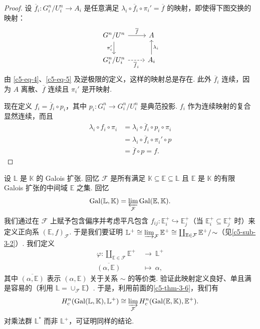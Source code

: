 \begin{proof}
设 $\overline{f}_i:G_i^n/U_i^n\to A_i$ 是任意满足 $\lambda_i\circ\overline{f}_i\circ\pi_i'=\overline{f}$ 的映射，即使得下图交换的映射：
\[
\begin{tikzcd}
G^n/U^n \arrow[r,"\overline{f}"] \arrow[d,"\pi_i'"'] & A \\
G_i^n/U_i^n \arrow[r,dashed,"\overline{f}_i"'] & A_i \arrow[u,"\lambda_i"']
\end{tikzcd}
\]
由 \eqref{c5-eq-4}、\eqref{c5-eq-5} 及逆极限的定义，这样的映射总是存在. 此外 $\overline{f}_i$ 连续，因为 $A$ 离散、$\overline{f}$ 连续且 $\pi_i'$ 是开映射.

现在定义 $f_i=\overline{f}_i\circ p_i$，其中 $p_i:G_i^n\to G_i^n/U_i^n$ 是典范投影. $f_i$ 作为连续映射的复合显然连续，而且
\[
\begin{aligned}
\lambda_i\circ f_i\circ\pi_i&=\lambda_i\circ\overline{f}_i\circ p_i\circ\pi_i\\
&=\lambda_i\circ\overline{f}_i\circ\pi_i'\circ p\\
&=\overline{f}\circ p=f.
\end{aligned}
\]
\end{proof}

\begin{example}\label{c5-ex-3-7}
设 $\mathbb{L}$ 是 $\mathbb{K}$ 的 Galois 扩张. 回忆 $\mathcal{F}$ 是所有满足 $\mathbb{K}\subseteq\mathbb{E}\subseteq\mathbb{L}$ 且 $\mathbb{E}$ 是 $\mathbb{K}$ 的有限 Galois 扩张的中间域 $\mathbb{E}$ 之集. 回忆
\[
\mathrm{Gal}(\mathbb{L},\mathbb{K})=\varprojlim_{\mathcal{F}}\mathrm{Gal}(\mathbb{E},\mathbb{K}).
\]
我们通过在 $\mathcal{F}$ 上赋予包含偏序并考虑平凡包含 $f_{ij}:\mathbb{E}_i^+\hookrightarrow\mathbb{E}_j^+$（当 $\mathbb{E}_i^+\subseteq\mathbb{E}_j^+$ 时）来定义正向系 $(\mathbb{E},f)_{\mathcal{F}}$. 于是我们要证明 $\mathbb{L}^+\cong\varinjlim_{\mathcal{F}}\mathbb{E}^+\cong\coprod_{\mathbb{E}\in\mathcal{F}}\mathbb{E}^+/\!\sim$（见\autoref{c5-sub-3-2}）. 我们定义
\[
\begin{aligned}
\varphi:\coprod_{\mathbb{E}\in\mathcal{F}}\mathbb{E}^+\ &\to\ \mathbb{L}^+\\
\overline{(\alpha,\mathbb{E})}\ &\mapsto\ \alpha,
\end{aligned}
\]
其中 $\overline{(\alpha,\mathbb{E})}$ 表示 $(\alpha,\mathbb{E})$ 关于关系 $\sim$ 的等价类. 验证此映射定义良好、单且满是容易的（利用 $\mathbb{L}=\cup_{\mathcal{F}}\mathbb{E}$）. 于是，利用前面的\autoref{c5-thm-3-6}，我们有
\[
H^n_c(\mathrm{Gal}(\mathbb{L},\mathbb{K}),\mathbb{L}^+)\cong\varinjlim_{\mathcal{F}}H^n_c(\mathrm{Gal}(\mathbb{E},\mathbb{K}),\mathbb{E}^+).
\]
对乘法群 $\mathbb{L}^*$ 而非 $\mathbb{L}^+$，可证明同样的结论.
\end{example}

